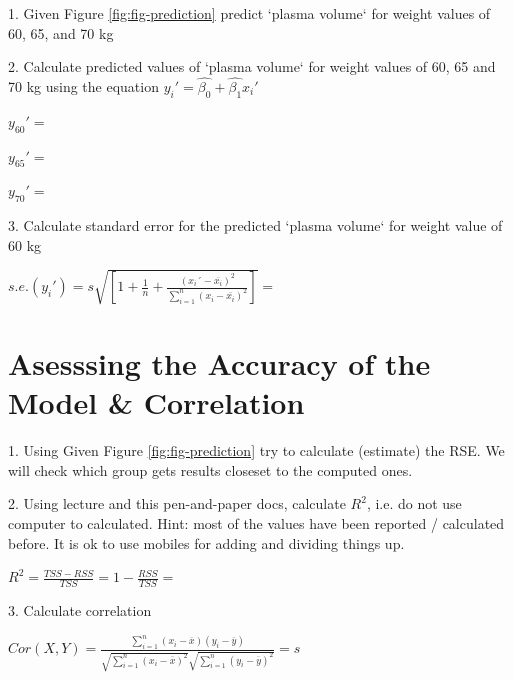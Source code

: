 \documentclass[12pt]{article}\usepackage[]{graphicx}\usepackage[]{color}
\begin{document}
1. Given Figure \ref{fig:fig-prediction} predict `plasma volume` for weight values of 60, 65, and 70 kg

2. Calculate predicted values of `plasma volume` for weight values of 60, 65 and 70 kg using the equation  $y_i'=\hat{\beta_0}+\hat{\beta_1}x_i'$

$y_{60}'=$ \vspace{0.2cm}

$y_{65}'=$ \vspace{0.2cm}

$y_{70}'=$ \vspace{0.2cm}


3. Calculate standard error for the predicted `plasma volume` for weight value of 60 kg \newline \vspace{0.4cm}

$s.e.(y_i')=s\sqrt{[1+\frac{1}{n}+\frac{(x_i´-\overline{x_i})^2}{\sum_{i=1}^{n}(x_i-\overline{x_i})^2}]}=$ \vspace{0.2cm}

\newpage
\section{Asesssing the Accuracy of the Model \& Correlation}
1. Using Given Figure \ref{fig:fig-prediction} try to calculate (estimate) the RSE. We will check which group gets results closeset to the computed ones. 

2. Using lecture and this pen-and-paper docs, calculate $R^2$, i.e. do not use computer to calculated. Hint: most of the values have been reported / calculated before. It is ok to use mobiles for adding and dividing things up. \newline \vspace{0.2cm}

$R^2=\frac{TSS-RSS}{TSS}=1-\frac{RSS}{TSS}=$ \vspace{0.2cm}

3. Calculate correlation \newline \vspace{0.2cm}

$Cor(X,Y)=\frac{\sum_{i=1}^{n}(x_i-\overline{x})(y_i-\overline{y})}{\sqrt{\sum_{i=1}^{n}(x_i-\overline{x})^2}\sqrt{\sum_{i=1}^{n}(y_i-\overline{y})^2}}=s$
\end{document}
